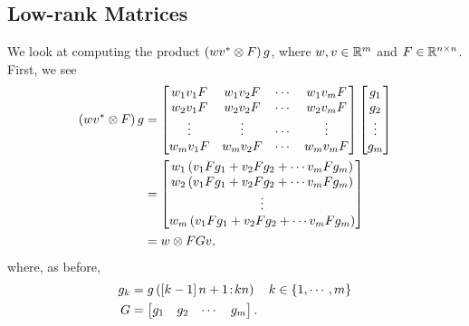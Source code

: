 \subsection{Low-rank Matrices}
\label{ssec:FastKronProdLowRank}

We look at computing the product $\left( wv^{*}\otimes F \right)g$,
where $w,v\in\mathbb{R}^{m}$ and $F\in\mathbb{R}^{n\times n}$.
First, we see
%
\begin{align}
    \left( wv^{*}\otimes F \right)g &= \begin{bmatrix}
        w_{1}v_{1}F & w_{1}v_{2}F & \cdots & w_{1}v_{m}F \\
        w_{2}v_{1}F & w_{2}v_{2}F & \cdots & w_{2}v_{m}F \\
        \vdots & \vdots & \cdots & \vdots \\
        w_{m}v_{1}F & w_{m}v_{2}F & \cdots & w_{m}v_{m}F \\
    \end{bmatrix}
    \begin{bmatrix} g_{1} \\ g_{2} \\ \vdots \\ g_{m} \end{bmatrix} \nonumber\\
    &= \begin{bmatrix}
        w_{1}\left( v_{1}Fg_{1} + v_{2}Fg_{2} + \cdots v_{m}Fg_{m} \right) \\
        w_{2}\left( v_{1}Fg_{1} + v_{2}Fg_{2} + \cdots v_{m}Fg_{m} \right) \\
        \vdots \\
        w_{m}\left( v_{1}Fg_{1} + v_{2}Fg_{2} + \cdots v_{m}Fg_{m} \right) \\
        \end{bmatrix} \nonumber\\
    &= w\otimes FGv,
\end{align}
%
where, as before, 
%
\begin{align}
    g_{k} &= g\left( \left[ k-1 \right]n + 1\!:\!kn \right)
        \quad k\in\left\{ 1,\cdots,m \right\} \nonumber\\
    G &= \begin{bmatrix}
        g_{1} & g_{2} & \cdots & g_{m}
        \end{bmatrix}.
\end{align}

